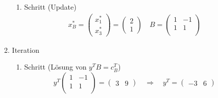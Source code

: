 \documentclass[a4paper]{scrartcl}
\begin{document}
\begin{enumerate}[label=\bfseries\arabic*.]
\begin{enumerate}[1.]
\begin{enumerate}[1.]
                    \item Schritt (Update)
                        \begin{gather}
                            x_B^* =
                            \begin{pmatrix}
                                x_1^* \\ x_3^*
                            \end{pmatrix}
                            =
                            \begin{pmatrix}
                                2 \\ 1
                            \end{pmatrix}
                            \quad
                            B =
                            \begin{pmatrix}
                                1 & -1 \\
                                1 &  1 \\
                            \end{pmatrix}
                        \end{gather}

                \end{enumerate}

            \item Iteration
                \begin{enumerate}[1.]
                    \item Schritt (Lösung von $y^TB = c_B^T$)
                        \begin{equation}
                            y^T
                            \begin{pmatrix}
                                1 & -1 \\
                                1 &  1 \\
                            \end{pmatrix}
                            =
                            \begin{pmatrix}
                                3 & 9
                            \end{pmatrix}
                            \quad\Rightarrow\quad
                            y^T =
                            \begin{pmatrix}
                                -3 & 6
                            \end{pmatrix}
                        \end{equation}
                        

\end{enumerate}
\end{enumerate}
\end{enumerate}
\end{document}
